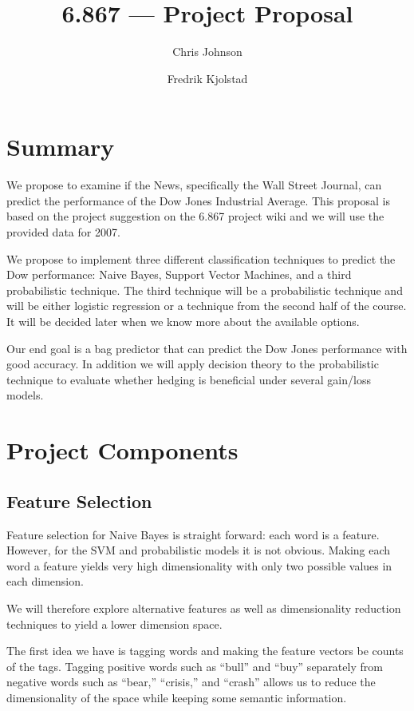 \documentclass[10pt]{article}
\begin{document}
\title{6.867 --- Project Proposal}
\author{Chris Johnson \and Fredrik Kjolstad}
\date{}
\maketitle

\section{Summary}
We propose to examine if the News, specifically the Wall Street Journal, can predict the performance of the Dow Jones Industrial Average.
This proposal is based on the project suggestion on the 6.867 project wiki and we will use the provided data for 2007.

We propose to implement three different classification techniques to predict the Dow performance: Naive Bayes, Support Vector Machines, and a third probabilistic technique. The third technique will be a probabilistic technique and will be either logistic regression or a technique from the second half of the course.
It will be decided later when we know more about the available options.

Our end goal is a bag predictor that can predict the Dow Jones performance with good accuracy.
In addition we will apply decision theory to the probabilistic technique to evaluate whether hedging is beneficial under several gain/loss models.

\section{Project Components}


\subsection{Feature Selection}
Feature selection for Naive Bayes is straight forward: each word is a feature.
However, for the SVM and probabilistic models it is not obvious.
Making each word a feature yields very high dimensionality with only two possible values in each dimension.

We will therefore explore alternative features as well as dimensionality reduction techniques to yield a lower dimension space.

The first idea we have is tagging words and making the feature vectors be counts of the tags. 
Tagging positive words such as ``bull'' and ``buy'' separately from negative words such as ``bear,'' ``crisis,'' and ``crash'' allows us to reduce the dimensionality of the space while keeping some semantic information.
\end{document}
